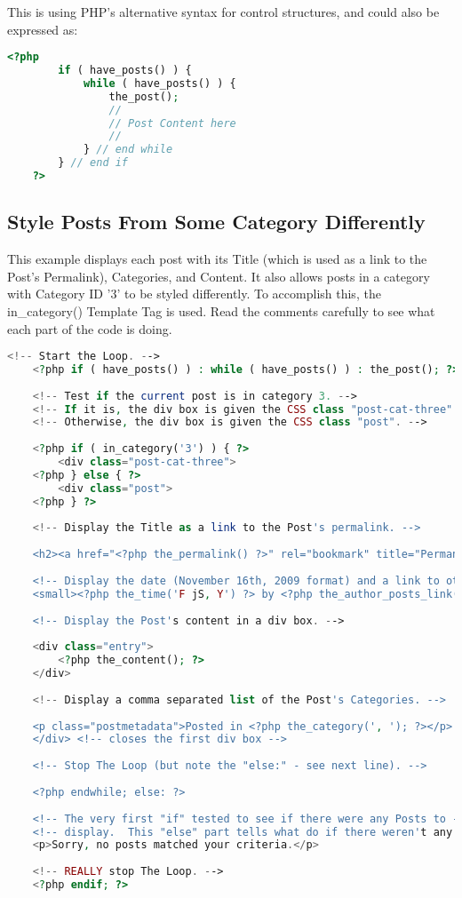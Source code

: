This is using PHP's alternative syntax for control structures, and could also be expressed as:

\begin{lstlisting}[language=PHP]
	<?php 
		if ( have_posts() ) {
			while ( have_posts() ) {
				the_post(); 
				//
				// Post Content here
				//
			} // end while
		} // end if
	?>
\end{lstlisting}

\subsection{Style Posts From Some Category Differently}

This example displays each post with its Title (which is used as a link to the Post's Permalink), Categories, and Content. It also allows posts in a category with Category ID '3' to be styled differently. To accomplish this, the in\_category() Template Tag is used. Read the comments carefully to see what each part of the code is doing.

\begin{lstlisting}[language=PHP]
	<!-- Start the Loop. -->
	<?php if ( have_posts() ) : while ( have_posts() ) : the_post(); ?>
	
	<!-- Test if the current post is in category 3. -->
	<!-- If it is, the div box is given the CSS class "post-cat-three". -->
	<!-- Otherwise, the div box is given the CSS class "post". -->
	
	<?php if ( in_category('3') ) { ?>
		<div class="post-cat-three">
	<?php } else { ?>
		<div class="post">
	<?php } ?>
	
	<!-- Display the Title as a link to the Post's permalink. -->
	
	<h2><a href="<?php the_permalink() ?>" rel="bookmark" title="Permanent Link to <?php the_title_attribute(); ?>"><?php the_title(); ?></a></h2>
		
	<!-- Display the date (November 16th, 2009 format) and a link to other posts by this posts author. -->
	<small><?php the_time('F jS, Y') ?> by <?php the_author_posts_link() ?></small>
	
	<!-- Display the Post's content in a div box. -->
	
	<div class="entry">
		<?php the_content(); ?>
	</div>
	
	<!-- Display a comma separated list of the Post's Categories. -->
	
	<p class="postmetadata">Posted in <?php the_category(', '); ?></p>
	</div> <!-- closes the first div box -->
	
	<!-- Stop The Loop (but note the "else:" - see next line). -->
	
	<?php endwhile; else: ?>
	
	<!-- The very first "if" tested to see if there were any Posts to -->
	<!-- display.  This "else" part tells what do if there weren't any. -->
	<p>Sorry, no posts matched your criteria.</p>
	
	<!-- REALLY stop The Loop. -->
	<?php endif; ?>
\end{lstlisting}



